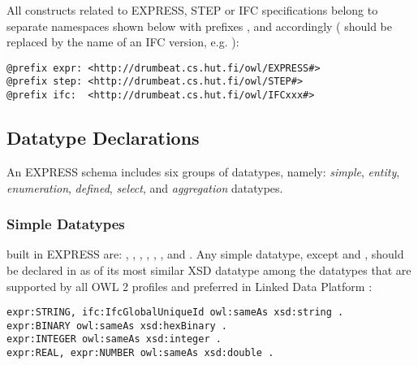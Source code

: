 All constructs related to EXPRESS, STEP or IFC specifications belong to separate namespaces shown below with prefixes ,  and  accordingly ( should be replaced by the name of an IFC version, e.g. ):

\begin{lstlisting}
@prefix expr: <http://drumbeat.cs.hut.fi/owl/EXPRESS#>
@prefix step: <http://drumbeat.cs.hut.fi/owl/STEP#>
@prefix ifc:  <http://drumbeat.cs.hut.fi/owl/IFCxxx#>
\end{lstlisting}




\subsection{Datatype Declarations}
\label{subsec:ifcOWL-types}

An EXPRESS schema includes six groups of data\-types, namely: \emph{simple}, \emph{entity}, \emph{enumeration}, \emph{defined}, \emph{select}, and \emph{aggregation} data\-types.



\subsubsection{Simple Datatypes} built in EXPRESS are: , , , , , , and . Any simple data\-type, except  and , should be declared in \ifcowl{} as  of its most similar XSD data\-type among the data\-types that are supported by all OWL 2 profiles \cite{motik2012owl} and preferred in Linked Data Platform \cite{ldp-best-practices}:

\begin{lstlisting}
expr:STRING, ifc:IfcGlobalUniqueId owl:sameAs xsd:string .
expr:BINARY owl:sameAs xsd:hexBinary .
expr:INTEGER owl:sameAs xsd:integer .
expr:REAL, expr:NUMBER owl:sameAs xsd:double .
\end{lstlisting}

